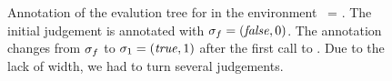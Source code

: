 \begin{figure}[t]
\begin{minipage}{\linewidth}
   \iffalse
    \begin{center}
      (a) 
    \end{center}
    \vspace{2ex}
    \[
    \scalebox{.45}{
      \inference{
        \inference{}{
          \mevj{\evj{\vectxf}{\ttt{1}}{\ttt{1}}}{}{\vstf}
        }
        &
        \inference{}{
          \mevj{\evj{\vectxf}{\ttt{f}}{\vvf}}{}{\vstf}
        }
        &
        \inference{
          \inference{
            \vdots
          }{
            \mevj{\evj{\vectxfxone}{\ttt{x~>~0}}{\ttt{true}}}{}{\vstf}
          }
          &
          \inference{
            \inference{
              \vdots
            }{
              \mevj{\evj{\vectxfxone}{\ttt{x~-~1}}{\ttt{0}}}{}{\vstf}
            }
            &
            \inference{
            }{
              \mevj{\evj{\vectxfxone}{\ttt{f}}{\vvf}}{}{\vstf}
            }
            &
            \inference{
              \inference{
                \vdots
              }{
                \mevj{\evj{\vectxfxzero}{\ttt{x~>~0}}{\ttt{true}}}{}{\vstzero}
              }
              &
              \inference{
              }{
                \mevj{\evj{\vectxfxzero}{\ttt{fun~y~->~y~+~1}}{\vvfx}}{}{\vstzero}
              }
            }{
              \mevj{\evj{ \underbrace{\vectxf \eext \ttt{x} \emapsto \ttt{0}}_{\vectxfxzero} }{\ttt{if~x~>~0~then~\ldots}}{\vvfx}}{}{\vstzero}
            }
          }{
            \mevj{\evj{\vectxfxone}{\ttt{f (x - 1)}}{\vvfx}}{}{\vstf}
          }
        }{
          \mevj{\evj{ \underbrace{\vectxf \eext \ttt{x} \emapsto \ttt{1}}_{\vectxfxone} }{\ttt{if~x~>~0~then~\ldots}}{\vvfx}}{}{\vstf}
        }
      }{
        \mevj{\evj{\underbrace{\ttt{f} \emapsto \underbrace{\vf}_{\vvf}}_{\vectxf}}{\ttt{f\ 1}}{\underbrace{\vfx}_{\vvfx}}}{}{\vstf}
      }
    }
    \]
    \begin{center}
      (b)
    \end{center}
    \fi
  \end{minipage}

  \caption{Annotation of the evalution tree for  in the 
     environment \vectxf\ = \vf.
     The initial judgement is annotated with $\sigma_{f} = (\mathit{false}, 0)$. 
     The annotation changes from $\sigma_{f}$ to $\sigma_{1} = (\mathit{true}, 1)$ 
     after the first call to .
     Due to the lack of width, we had to turn several judgements.
   }




  \label{fig-monitoring}
\end{figure}

